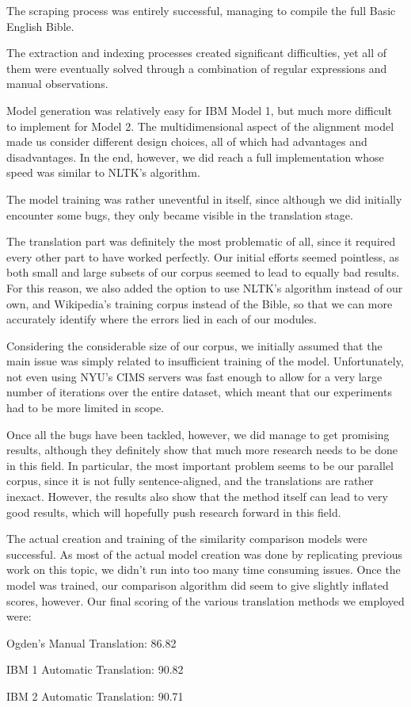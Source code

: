 \documentclass[11pt]{article}
\begin{document}
The scraping process was entirely successful, managing to compile the full Basic English Bible.

The extraction and indexing processes created significant difficulties, yet all of them were eventually solved through a combination of regular expressions and manual observations.

Model generation was relatively easy for IBM Model 1, but much more difficult to implement for Model 2. The multidimensional aspect of the alignment model made us consider different design choices, all of which had advantages and disadvantages. In the end, however, we did reach a full implementation whose speed was similar to NLTK's algorithm.

The model training was rather uneventful in itself, since although we did initially encounter some bugs, they only became visible in the translation stage.

The translation part was definitely the most problematic of all, since it required every other part to have worked perfectly. Our initial efforts seemed pointless, as both small and large subsets of our corpus seemed to lead to equally bad results. For this reason, we also added the option to use NLTK's algorithm instead of our own, and Wikipedia's training corpus instead of the Bible, so that we can more accurately identify where the errors lied in each of our modules.

Considering the considerable size of our corpus, we initially assumed that the main issue was simply related to insufficient training of the model. Unfortunately, not even using NYU's CIMS servers was fast enough to allow for a very large number of iterations over the entire dataset, which meant that our experiments had to be more limited in scope.

Once all the bugs have been tackled, however, we did manage to get promising results, although they definitely show that much more research needs to be done in this field. In particular, the most important problem seems to be our parallel corpus, since it is not fully sentence-aligned, and the translations are rather inexact. However, the results also show that the method itself can lead to very good results, which will hopefully push research forward in this field.

The actual creation and training of the similarity comparison models were successful. As most of the actual model creation was done by replicating previous work on this topic, we didn’t run into too many time consuming issues. Once the model was trained, our comparison algorithm did seem to give slightly inflated scores, however. Our final scoring of the various translation methods we employed were: 
\begin{center}
Ogden’s Manual Translation: 86.82%

IBM 1 Automatic Translation: 90.82%

IBM 2 Automatic Translation: 90.71%
\end{center}
\end{document}
